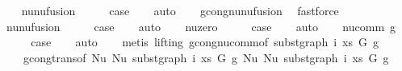 \begin{isabellebody}
\isamarkupfalse%
\isanewline
\ \ \isamarkupfalse%
\ nu{\isacharunderscore}{\kern0pt}nu{\isacharunderscore}{\kern0pt}fusion{}\isanewline
\ \ \isamarkupfalse%
\ \isamarkupfalse%
\ {\isacharquery}{\kern0pt}case\isanewline
\ \ \isamarkupfalse%
\ auto\isanewline
\ \ \isamarkupfalse%
\ gcong{\isachardot}{\kern0pt}nu{\isacharunderscore}{\kern0pt}nu{\isacharunderscore}{\kern0pt}fusion{}\ \isamarkupfalse%
\ fastforce\isanewline
{}\isamarkupfalse%
\isanewline
\ \ \isamarkupfalse%
\ nu{\isacharunderscore}{\kern0pt}nu{\isacharunderscore}{\kern0pt}fusion{}\isanewline
\ \ \isamarkupfalse%
\ \isamarkupfalse%
\ {\isacharquery}{\kern0pt}case\isanewline
\ \ \isamarkupfalse%
\ auto\isanewline
{}\isamarkupfalse%
\isanewline
\ \ \isamarkupfalse%
\ nu{\isacharunderscore}{\kern0pt}zero\isanewline
\ \ \isamarkupfalse%
\ \isamarkupfalse%
\ {\isacharquery}{\kern0pt}case\isanewline
\ \ \isamarkupfalse%
\ auto\isanewline
{}\isamarkupfalse%
\isanewline
\ \ \isamarkupfalse%
\ {\isacharparenleft}{\kern0pt}nu{\isacharunderscore}{\kern0pt}comm\ g{\isacharparenright}{\kern0pt}\isanewline
\ \ \isamarkupfalse%
\ \isamarkupfalse%
\ {\isacharquery}{\kern0pt}case\isanewline
\ \ \isamarkupfalse%
\ auto\isanewline
\ \ \isamarkupfalse%
\ {\isacharparenleft}{\kern0pt}metis\ {\isacharparenleft}{\kern0pt}lifting{\isacharparenright}{\kern0pt}\ gcong{\isachardot}{\kern0pt}nu{\isacharunderscore}{\kern0pt}comm{\isacharbrackleft}{\kern0pt}of\ {\isachardoublequoteopen}subst{\isacharunderscore}{\kern0pt}graph\ i\ xs\ G{}\ g{\isachardoublequoteclose}{\isacharbrackright}{\kern0pt}\isanewline
\ \ \ \ gcong{\isachardot}{\kern0pt}trans{\isacharbrackleft}{\kern0pt}of\ {\isachardoublequoteopen}Nu\ {\isacharparenleft}{\kern0pt}Nu\ {\isacharparenleft}{\kern0pt}subst{\isacharunderscore}{\kern0pt}graph\ i\ xs\ G{}\ g{\isacharparenright}{\kern0pt}{\isacharparenright}{\kern0pt}{\isachardoublequoteclose}\ {\isachardoublequoteopen}Nu\ {\isacharparenleft}{\kern0pt}Nu\ {\isacharparenleft}{\kern0pt}subst{\isacharunderscore}{\kern0pt}graph\ i\ xs\ G{}\ g{\isacharparenright}{\kern0pt}{\isacharparenright}{\kern0pt}{\isachardoublequoteclose}\isanewline

\end{isabellebody}
